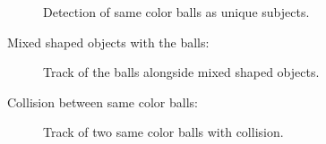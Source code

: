 \documentclass{sciposter}
\begin{document}
\begin{multicols}{3}
\begin{figure}[!h]
	\centering
			\setlength{\fboxsep}{1pt}
			\setlength{\fboxrule}{1pt}
	\caption{Detection of same color balls as unique subjects.}
	\label{fig:same_color}
\end{figure}

Mixed shaped objects with the balls:

\begin{figure}[!h]
	\centering
			\setlength{\fboxsep}{1pt}
			\setlength{\fboxrule}{1pt}
	\caption{Track of the balls alongside mixed shaped objects.}
	\label{fig:mixed_shape}
\end{figure}

Collision between same color balls:

\begin{figure}[!h]
	\centering
			\setlength{\fboxsep}{1pt}
			\setlength{\fboxrule}{1pt}
	\caption{Track of two same color balls with collision.}
	\label{fig:call_same_color}
\end{figure}


\end{multicols}
\end{document}
